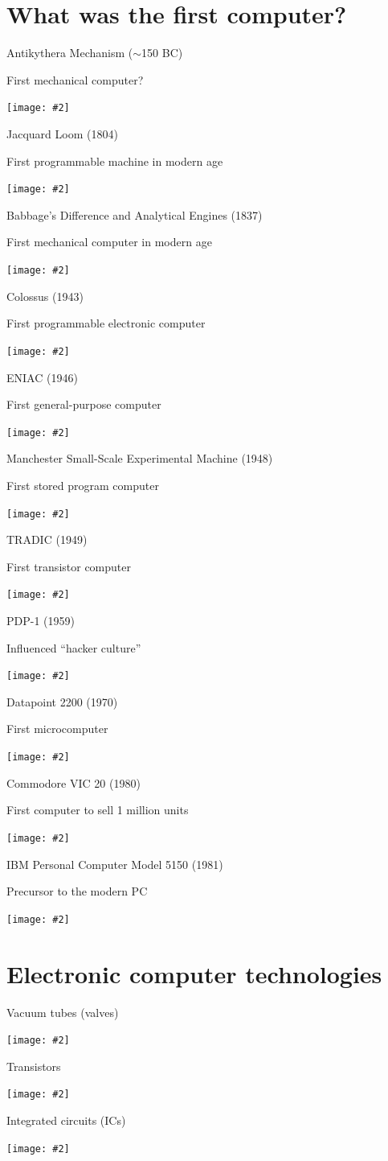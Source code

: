 \newcommand{\pictureslideb}[3]{
	\begin{frame}{#1}
		\begin{center}
			#3
			
			\vspace{6pt}
			
			\texttt{[image: \#2]}
		\end{center}
	\end{frame}
}

\newcommand{\pictureslide}[2]{
	\begin{frame}{#1}
		\begin{center}
			\texttt{[image: \#2]}
		\end{center}
	\end{frame}
}

\part{What was the first computer?}
\frame{\partpage}

\pictureslideb{Antikythera Mechanism ($\sim$150 BC)}{antikythera}{First mechanical computer?}
\pictureslideb{Jacquard Loom (1804)}{jacquard}{First programmable machine in modern age}
\pictureslideb{Babbage's Difference and Analytical Engines (1837)}{difference_engine}{First mechanical computer in modern age}
\pictureslideb{Colossus (1943)}{colossus}{First programmable electronic computer}
\pictureslideb{ENIAC (1946)}{eniac}{First general-purpose computer}
\pictureslideb{Manchester Small-Scale Experimental Machine (1948)}{manchester}{First stored program computer}
\pictureslideb{TRADIC (1949)}{tradic}{First transistor computer}
\pictureslideb{PDP-1 (1959)}{pdp1}{Influenced ``hacker culture''}
\pictureslideb{Datapoint 2200 (1970)}{datapoint2200}{First microcomputer}
\pictureslideb{Commodore VIC 20 (1980)}{vic20}{First computer to sell 1 million units}
\pictureslideb{IBM Personal Computer Model 5150 (1981)}{ibm_5150}{Precursor to the modern PC}

\part{Electronic computer technologies}
\frame{\partpage}

\pictureslide{Vacuum tubes (valves)}{vacuum_tubes}
\pictureslide{Transistors}{transistors}
\pictureslide{Integrated circuits (ICs)}{6502}

